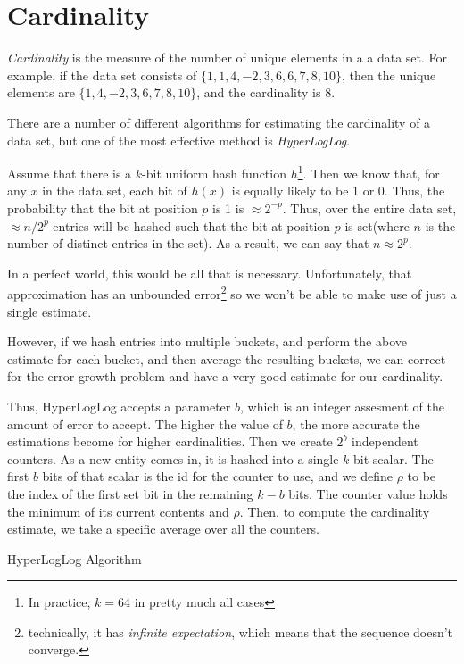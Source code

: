 \section{Cardinality}
\label{sec:HyperLogLog}
\emph{Cardinality} is the measure of the number of unique elements in a a data set. For example, if the data set consists of $\lbrace 1,1,4,-2,3,6,6,7,8,10\rbrace$, then the unique elements are $\lbrace 1,4,-2,3,6,7,8,10\rbrace$, and the cardinality is 8. 

There are a number of different algorithms for estimating the cardinality of a data set, but one of the most effective method is \emph{HyperLogLog}\cite{Flajolet07hyperloglog:the}. 

Assume that there is a $k$-bit uniform hash function $h$\footnote{In practice, $k = 64$ in pretty much all cases}. Then we know that, for any $x$ in the data set, each bit of $h(x)$ is equally likely to be 1 or 0. Thus, the probability that the bit at position $p$ is 1 is $\approx 2^{-p}$. Thus, over the entire data set, $\approx n/2^p$ entries will be hashed such that the bit at position $p$ is set(where $n$ is the number of distinct entries in the set). As a result, we can say that $n \approx 2^p$.

In a perfect world, this would be all that is necessary. Unfortunately, that approximation has an unbounded error\footnote{technically, it has \emph{infinite expectation}, which means that the sequence doesn't converge.} so we won't be able to make use of just a single estimate. 

However, if we hash entries into multiple buckets, and perform the above estimate for each bucket, and then average the resulting buckets, we can correct for the error growth problem and have a very good estimate for our cardinality.

Thus, HyperLogLog accepts a parameter $b$, which is an integer assesment of the amount of error to accept. The higher the value of $b$, the more accurate the estimations become for higher cardinalities. Then we create $2^b$ independent counters. As a new entity comes in, it is hashed into a single $k$-bit scalar. The first $b$ bits of that scalar is the id for the counter to use, and we define $\rho$ to be the index of the first set bit in the remaining $k-b$ bits. The counter value holds the minimum of its current contents and $\rho$. Then, to compute the cardinality estimate, we take a specific average over all the counters.

\begin{algorithm}[ht]
				\caption{HyperLogLog Algorithm}
\end{algorithm}

